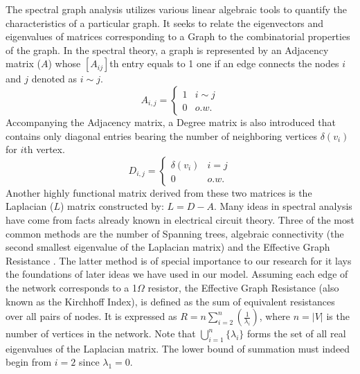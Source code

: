 \documentclass{article}
\begin{document}
	The spectral graph analysis utilizes various linear algebraic tools to quantify the characteristics of a particular graph. It seeks to relate the eigenvectors and eigenvalues of matrices corresponding to a Graph to the combinatorial properties of the graph. In the spectral theory, a graph is represented by an Adjacency matrix ($A$) whose $[A_{ij}]$th entry equals to 1 one if an edge connects the nodes $i$ and $j$ denoted as $i\sim j$.
	\begin{equation*}
		A_{i,j} = \begin{cases}
			1	& i\sim j \\
			0	& o.w. 
		\end{cases}
	\end{equation*}
	Accompanying the Adjacency matrix, a Degree matrix is also introduced that contains only diagonal entries bearing the number of neighboring vertices $\delta(v_i)$ for $i$th vertex.
	\begin{equation*}
		D_{i,j} = \begin{cases}
			\delta(v_i) & i=j \\
			0 & o.w.
		\end{cases}
	\end{equation*}
	Another highly functional matrix derived from these two matrices is the Laplacian ($L$) matrix constructed by: $L=D-A$. Many ideas in spectral analysis have come from facts already known in electrical circuit theory. Three of the most common methods are the number of Spanning trees, algebraic connectivity (the second smallest eigenvalue of the Laplacian matrix) and the Effective Graph Resistance \cite{ellens2013graph}. The latter method is of special importance to our research for it lays the foundations of later ideas we have used in our model. 
	Assuming each edge of the network corresponds to a 1$\Omega$ resistor, the Effective Graph Resistance (also known as the Kirchhoff Index), is defined as the sum of equivalent resistances over all pairs of nodes. It is expressed as
	$R = n \sum_{i=2}^{n}(\frac{1}{\lambda_{i}})$, where $n = |V|$ is the number of vertices in the network\cite{klein1993m}\cite{yamashita2021effective}. Note that $\bigcup_{i=1}^{n} \{\lambda_i\}$ forms the set of all real eigenvalues of the Laplacian matrix. The lower bound of summation must indeed begin from $i=2$ since $\lambda_1 = 0$.
	
\end{document}
